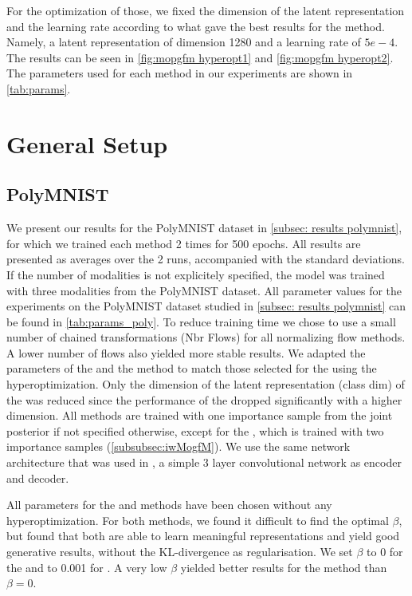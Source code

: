 For the optimization of those, we fixed the dimension of the latent representation and the learning rate according to what gave the best results for the  method.
Namely, a latent representation of dimension 1280 and a learning rate of $5e-4$.
The results can be seen in \cref{fig:mopgfm hyperopt1} and \cref{fig:mopgfm hyperopt2}.
The parameters used for each method in our experiments are shown in \cref{tab:params}.


\section{General Setup}

\subsection{PolyMNIST}
We present our results for the PolyMNIST dataset in \cref{subsec: results polymnist}, for which we trained each method 2 times for 500 epochs.
All results are presented as averages over the 2 runs, accompanied with the standard deviations.
If the number of modalities is not explicitely specified, the model was trained with three modalities from the PolyMNIST dataset.
All parameter values for the experiments on the PolyMNIST dataset studied in \cref{subsec: results polymnist} can be found in \cref{tab:params_poly}.
To reduce training time we chose to use a small number of chained transformations (Nbr Flows) for all normalizing flow methods.
A lower number of flows also yielded more stable results.
We adapted the parameters of the  and the  method to match those selected for the  using the hyperoptimization.
Only the dimension of the latent representation (class dim) of the  was reduced since the performance of the  dropped significantly with a higher dimension.
All methods are trained with one importance sample from the joint posterior if not specified otherwise, except for the , which is trained with two importance samples (\cref{subsubsec:iwMogfM}).
We use the same network architecture that was used in \citep{sutter_generalized_2020}, a simple 3 layer convolutional network as encoder and decoder.

All parameters for the  and  methods have been chosen without any hyperoptimization.
For both methods, we found it difficult to find the optimal $\beta$, but found that both are able to learn meaningful representations and yield good generative results, without the KL-divergence as regularisation.
We set $\beta$ to 0 for the  and to 0.001 for .
A very low $\beta$ yielded better results for the  method than $\beta = 0$.



